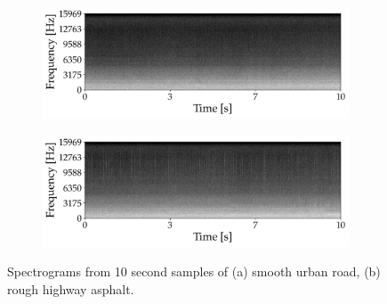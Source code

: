 \begin{figure}[ht]
	\centering
	\begin{subfigure}[b]{0.48\textwidth}
		\includegraphics[width=\textwidth]{img/specgram_REC007}
	\end{subfigure}
	\hfil
	\begin{subfigure}[b]{0.48\textwidth}
		\includegraphics[width=\textwidth]{img/specgram_REC015}
	\end{subfigure}
	\caption[Road Noise Spectrograms]{Spectrograms from 10 second samples of (a) smooth urban road, (b) rough highway asphalt.}
\label{fig:road_spectrograms}
\end{figure}

